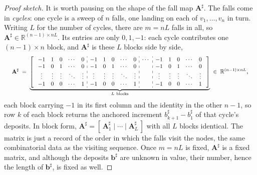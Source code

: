 \documentclass[11pt]{article}
\theoremstyle{definition}
\begin{document}
\begin{proof}[Proof sketch]
\smallskip\noindent It is worth pausing on the shape of the fall map $\mathbf{A}^{\sharp}$. The falls come in \emph{cycles}: one cycle is a sweep of $n$ falls, one landing on each of $v_1,\dots,v_n$ in turn. Writing $L$ for the number of cycles, there are $m=nL$ falls in all, so $\mathbf{A}^{\sharp}\in\mathbb{R}^{(n-1)\times nL}$. Its entries are only $0,1,-1$: each cycle contributes one $(n-1)\times n$ block, and $\mathbf{A}^{\sharp}$ is these $L$ blocks side by side,
\[
  \resizebox{0.97\textwidth}{!}{$\displaystyle
  \mathbf{A}^{\sharp} \;=\;
  \underbrace{\left[\;
  \begin{array}{ccccc:ccccc:c:ccccc}
    -1 & 1 & 0 & \cdots & 0 & -1 & 1 & 0 & \cdots & 0 & \cdots & -1 & 1 & 0 & \cdots & 0 \\
    -1 & 0 & 1 & \cdots & 0 & -1 & 0 & 1 & \cdots & 0 &        & -1 & 0 & 1 & \cdots & 0 \\
    \vdots & \vdots & \vdots & \ddots & \vdots & \vdots & \vdots & \vdots & \ddots & \vdots &  & \vdots & \vdots & \vdots & \ddots & \vdots \\
    -1 & 0 & 0 & \cdots & 1 & -1 & 0 & 0 & \cdots & 1 &        & -1 & 0 & 0 & \cdots & 1 \\
  \end{array}
  \;\right]}_{L\ \text{blocks}} \;\in\; \mathbb{R}^{(n-1)\times nL}
  $},
\]
each block carrying $-1$ in its first column and the identity in the other $n-1$, so row $k$ of each block returns the anchored increment $b^{\sharp}_{k+1}-b^{\sharp}_{1}$ of that cycle's deposits. In block form, $\mathbf{A}^{\sharp} = [\,\mathbf{A}^{\sharp}_1 \mid \cdots \mid \mathbf{A}^{\sharp}_L\,]$ with all $L$ blocks identical. The matrix is just a record of the order in which the falls visit the nodes, the same combinatorial data as the visiting sequence. Once $m=nL$ is fixed, $\mathbf{A}^{\sharp}$ is a fixed matrix, and although the deposits $\mathbf{b}^{\sharp}$ are unknown in value, their number, hence the length of $\mathbf{b}^{\sharp}$, is fixed as well.


\end{proof}
\end{document}
